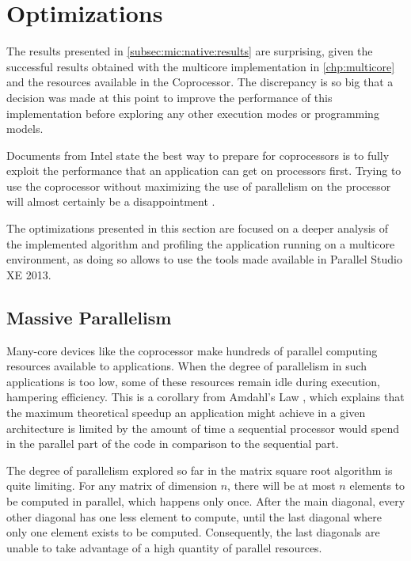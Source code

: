 \documentclass[../thesis]{subfiles}
\begin{document}
	\section{Optimizations}
	\label{sec:mic:optims}

	The results presented in \cref{subsec:mic:native:results} are surprising, given the successful results obtained with the multicore implementation in \cref{chp:multicore} and the resources available in the \intel\xeonphi Coprocessor. The discrepancy is so big that a decision was made at this point to improve the performance of this implementation before exploring any other execution modes or programming models.

	Documents from Intel state the best way to prepare for \intel\xeonphi coprocessors is to fully exploit the performance that an application can get on \intel\xeon processors first. Trying to use the coprocessor without maximizing the use of parallelism on the processor will almost certainly be a disappointment \cite{Intel:MIC:Overview}.

	The optimizations presented in this section are focused on a deeper analysis of the implemented algorithm and profiling the application running on a multicore environment, as doing so allows to use the tools made available in \intel Parallel Studio XE 2013.

	\subsection{Massive Parallelism}
	Many-core devices like the \intel\xeonphi coprocessor make hundreds of parallel computing resources available to applications. When the degree of parallelism in such applications is too low, some of these resources remain idle during execution, hampering efficiency. This is a corollary from Amdahl's Law \cite{Amdahl:1967}, which explains that the maximum theoretical speedup an application might achieve in a given architecture is limited by the amount of time a sequential processor would spend in the parallel part of the code in comparison to the sequential part.

	The degree of parallelism explored so far in the matrix square root algorithm is quite limiting. For any matrix of dimension $n$, there will be at most $n$ elements to be computed in parallel, which happens only once. After the main diagonal, every other diagonal has one less element to compute, until the last diagonal where only one element exists to be computed. Consequently, the last diagonals are unable to take advantage of a high quantity of parallel resources.
\end{document}
